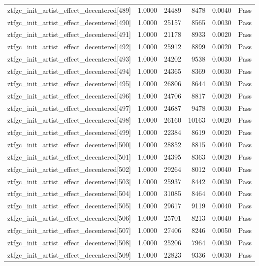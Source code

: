 \begin{table}[htbp]
\begin{tabular}{llrrll}
ztfgc\_init\_artist\_effect\_decentered[489] & 1.0000 & 24489 & 8478 & 0.0040 & Pass \\
ztfgc\_init\_artist\_effect\_decentered[490] & 1.0000 & 25157 & 8565 & 0.0030 & Pass \\
ztfgc\_init\_artist\_effect\_decentered[491] & 1.0000 & 21178 & 8933 & 0.0020 & Pass \\
ztfgc\_init\_artist\_effect\_decentered[492] & 1.0000 & 25912 & 8899 & 0.0020 & Pass \\
ztfgc\_init\_artist\_effect\_decentered[493] & 1.0000 & 24202 & 9538 & 0.0030 & Pass \\
ztfgc\_init\_artist\_effect\_decentered[494] & 1.0000 & 24365 & 8369 & 0.0030 & Pass \\
ztfgc\_init\_artist\_effect\_decentered[495] & 1.0000 & 26806 & 8644 & 0.0030 & Pass \\
ztfgc\_init\_artist\_effect\_decentered[496] & 1.0000 & 24706 & 8817 & 0.0020 & Pass \\
ztfgc\_init\_artist\_effect\_decentered[497] & 1.0000 & 24687 & 9478 & 0.0030 & Pass \\
ztfgc\_init\_artist\_effect\_decentered[498] & 1.0000 & 26160 & 10163 & 0.0020 & Pass \\
ztfgc\_init\_artist\_effect\_decentered[499] & 1.0000 & 22384 & 8619 & 0.0020 & Pass \\
ztfgc\_init\_artist\_effect\_decentered[500] & 1.0000 & 28852 & 8815 & 0.0040 & Pass \\
ztfgc\_init\_artist\_effect\_decentered[501] & 1.0000 & 24395 & 8363 & 0.0020 & Pass \\
ztfgc\_init\_artist\_effect\_decentered[502] & 1.0000 & 29264 & 8012 & 0.0040 & Pass \\
ztfgc\_init\_artist\_effect\_decentered[503] & 1.0000 & 25937 & 8442 & 0.0030 & Pass \\
ztfgc\_init\_artist\_effect\_decentered[504] & 1.0000 & 31085 & 8464 & 0.0040 & Pass \\
ztfgc\_init\_artist\_effect\_decentered[505] & 1.0000 & 29617 & 9119 & 0.0040 & Pass \\
ztfgc\_init\_artist\_effect\_decentered[506] & 1.0000 & 25701 & 8213 & 0.0040 & Pass \\
ztfgc\_init\_artist\_effect\_decentered[507] & 1.0000 & 27406 & 8246 & 0.0050 & Pass \\
ztfgc\_init\_artist\_effect\_decentered[508] & 1.0000 & 25206 & 7964 & 0.0030 & Pass \\
ztfgc\_init\_artist\_effect\_decentered[509] & 1.0000 & 22823 & 9336 & 0.0030 & Pass \\

\end{tabular}
\end{table}
